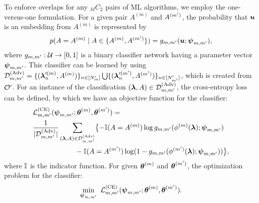 To enforce overlaps for any ${}_M C_2$ pairs of ML algorithms, we employ the one-versus-one formulation.
%
For a given pair $A^{(m)}$ and $A^{(m^\prime)}$, the probability that $\boldsymbol{u}$ is an embedding from $A^{(m)}$ is represented by
\begin{align*}
 p(A = A^{(m)} \mid A \in \{ A^{(m)}, A^{(m^\prime)} \} ) = g_{m,m^\prime}(\boldsymbol{u} ; \boldsymbol{\psi}_{m,m^\prime}),
\end{align*}
%
where 
$g_{m,m^\prime}: {\mathcal U} \rightarrow [0,1]$
is a binary classifier network having a parameter vector
$\boldsymbol{\psi}_{m,m^\prime}$.
%
This classifier can be learned by using 
${\mathcal D}^{\rm (Adv)}_{m,m^\prime} = 
\{ (\boldsymbol{\lambda}_n^{\prime (m)}, A^{(m)}) \}_{n \in [N^\prime_m]} 
\bigcup 
\{ (\boldsymbol{\lambda}_n^{\prime (m^\prime)}, A^{(m^\prime)}) \}_{n \in [N^\prime_{m^\prime}]}$, 
which is created from ${\mathcal O}^\prime$.
%
For an instance of the classification
$(\boldsymbol{\lambda}, A) \in {\mathcal D}^{\rm (Adv)}_{m,m^\prime}$, 
the cross-entropy loss can be defined, by which we have an objective function for the classifier:
\begin{align}
 & {\mathcal L}_{m,m^\prime}^{\rm (CE)}(\boldsymbol{\psi}_{m,m^\prime} ; \boldsymbol{\theta}^{(m)}, \boldsymbol{\theta}^{(m^\prime)}) = \notag
 \\
 & \frac{1}{| {\mathcal D}^{\rm (Adv)}_{m,m^\prime} |} 
 \sum_{ (\boldsymbol{\lambda}, A) \in {\mathcal D}^{\rm (Adv)}_{m,m^\prime} } \bigl\{
 - \mathbb{I}(A = A^{(m)}) \log g_{m,m^\prime}(\phi^{(m)}(\boldsymbol{\lambda}) ; \boldsymbol{\psi}_{m,m^\prime})  \notag
 \\
 & \hspace{6em} - \mathbb{I}(A = A^{(m^\prime)}) \log (1- g_{m,m^\prime}(\phi^{(m^\prime)}(\boldsymbol{\lambda}) ; \boldsymbol{\psi}_{m,m^\prime}))
 \bigr\}, 
 \label{eq:DANN_loss}
\end{align}
where $\mathbb{I}$ is the indicator function.
%
For given 
$\boldsymbol{\theta}^{(m)}$
and
$\boldsymbol{\theta}^{(m^\prime)}$, 
the optimization problem for the classifier: 
\begin{align*}
 \min_{\*\psi_{m,m^\prm}} \ 
 \cL_{m,m^\prm}^{\rm (CE)}(\*\psi_{m,m^\prm} ; \*\theta^{(m)}, \*\theta^{(m^\prm)}).
\end{align*}


